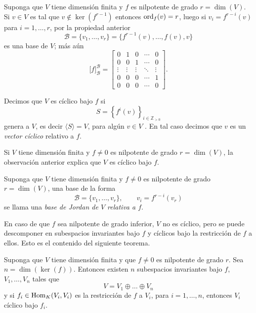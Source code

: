 \begin{obs}\label{obsformajordannil}
Suponga que $V$ tiene dimensi\'on finita y $f$ es nilpotente de grado $r=\dim(V)$. Si $v\in V$ es tal que $v\not\in\ker(f^{r-1})$ entonces $\operatorname{ord}_f(v)=r$, luego si $v_i=f^{r-i}(v)$ para $i=1,\ldots,r$, por la propiedad anterior
\[
\mathcal{B}=\{v_1,\ldots,v_r\}=\{f^{r-1}(v),\ldots,f(v),v\}
\]
es una base de $V$; m\'as a\'un
\[
\Big[f\Big]^{\mathcal{B}}_{\mathcal{B}}=\left[\begin{array}{ccccc}
0 & 1 & 0 &\cdots & 0\\
0 & 0 & 1 &\cdots & 0\\
\vdots & \vdots & \vdots &\ddots & \vdots\\
0 & 0 & 0 & \cdots & 1\\
0 & 0 & 0 & \cdots & 0
\end{array}\right].
\]
\end{obs}

\begin{defn}
Decimos que $V$ es c\'iclico bajo $f$ si
\[
S=\left\{f^i(v)\right\}_{i\in\mathbb{Z}_{>0}}
\]
genera a $V$, es decir $\langle S\rangle=V$, para alg\'un $v\in V$ . En tal caso decimos que $v$ es un \emph{vector c\'iclico} relativo a $f$.
\end{defn}

\begin{obs}
Si $V$ tiene dimensi\'on finita y $f\ne 0$ es nilpotente de grado $r=\dim(V)$, la observaci\'on anterior explica que $V$ es c\'iclico bajo $f$. 
\end{obs}

\begin{defn}
Suponga que $V$ tiene dimensi\'on finita y $f\ne 0$ es nilpotente de grado $r=\dim(V)$, una base de la forma
\[
\mathcal{B}=\{v_1,\ldots,v_r\},\qquad v_i=f^{r-i}(v_r)
\]
se llama una \emph{base de Jordan de $V$ relativa a $f$}.  
\end{defn}

\begin{obs}
En caso de que $f$ sea nilpotente de grado inferior, $V$ no es c\'iclico, pero se puede descomponer en subespacios invariantes bajo $f$ y c\'iclicos bajo la restricci\'on de $f$ a ellos. Esto es el contenido del siguiente teorema.
\end{obs}

\begin{teo}\label{formajordannil}
Suponga que $V$ tiene dimensi\'on finita y que $f\ne 0$ es nilpotente de grado $r$. Sea $n=\dim\left(\ker(f)\right)$. Entonces existen $n$ subespacios invariantes bajo $f$, $V_1,\ldots, V_n$ tales que  
\[
V=V_1\oplus\ldots\oplus V_n
\]
y si $f_i\in\operatorname{Hom}_K(V_i,V_i)$ es la restricci\'on de $f$ a $V_i$, para $i=1,\ldots,n$, entonces $V_i$ c\'iclico bajo $f_i$.
\end{teo}

